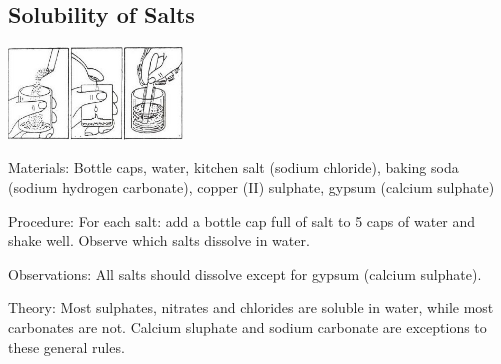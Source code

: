 \begin{multicols}{2}
%
%

\subsection{Solubility of Salts}

\begin{center}
\includegraphics[width=0.35\textwidth]{./img/source/salt-solubility.jpg}
\end{center}

\begin{description*}
\item[Materials:]{Bottle caps, water, kitchen salt (sodium chloride), baking soda (sodium hydrogen carbonate), copper (II) sulphate, gypsum (calcium sulphate)}
\item[Procedure:]{For each salt: add a bottle cap full of salt to 5 caps of water and shake well. Observe which salts dissolve in water.}
\item[Observations:]{All salts should dissolve except for gypsum (calcium sulphate).}
\item[Theory:]{Most sulphates, nitrates and chlorides are soluble in water, while most carbonates are not. Calcium sluphate and sodium carbonate are exceptions to these general rules.}
\end{description*}


\end{multicols}
